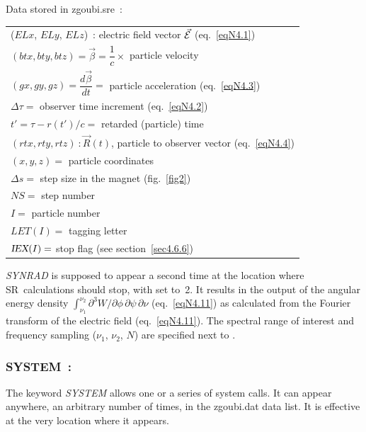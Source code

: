 {\bigskip

\noindent Data stored in zgoubi.sre~:
 
 \begin{tabular}{l} 
 ($ELx$, $ELy$, $ELz$)~:  electric field vector $\vec{\mathcal{E}} $ 
 						(eq.~\ref{eqN4.1}) \\
 $(btx, bty, btz) = \vec\beta= \dfrac{1}{c} \times$ particle velocity \\
$(gx, gy, gz) = \dfrac{d\vec\beta}{dt} =$ particle acceleration (eq.~\ref{eqN4.3}) \\					
$\Delta \tau =$ observer time increment (eq.~\ref{eqN4.2}) \\
$t' = \tau  - r(t')/c = $ retarded (particle) time \\
$(rtx, rty, rtz)~: \vec R(t)$, particle to observer vector (eq.~\ref{eqN4.4}) \\
$(x, y, z) =$ particle coordinates\\
$\Delta s = $ step size in the magnet (fig.~\ref{fig2})\\
$NS=$ step number\\
$I=$ particle number\\
$LET(I)=$ tagging letter\\      \index{tag, tag character} 
$\IEX(I)\index{IEX@{\IEX}}=$ stop flag (see section~\ref{sec4.6.6}) 
\end{tabular}
\bigskip


\noindent\textsl{SYNRAD} is supposed to appear a second time at the 
location where SR~calculations should stop, with \textsl{\KSR} set 
to~2. It results in the output of the angular energy density 
$\int_{\nu_1}^{\nu_2} \partial^3 W / \partial \phi \, \partial \psi 
\, \partial \nu$ (eq.~\ref{eqN4.11}) as calculated from the Fourier transform 
of the electric field (eq.~\ref{eqN4.11}). The spectral range of 
interest and frequency sampling ($\nu_1$, $\nu_2$, $N$) are specified 
next to \textsl{\KSR}.
\bigskip



\newpage

\subsubsection{SYSTEM~: \SYSTEMTitl}\label{SYSTEM}
\medskip 

\noindent The keyword \textsl{SYSTEM} allows one or a series of system calls. 
It can appear anywhere, an arbitrary number of times, 
 in the zgoubi.dat data list. It is effective at the very location where it appears. 

}
